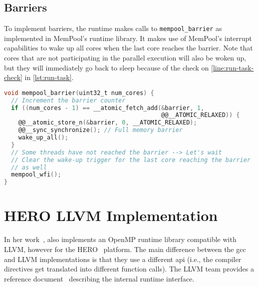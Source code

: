 \subsection{Barriers}
\label{subsec:barriers}

To implement barriers, the runtime makes calls to \texttt{mempool\_barrier} as implemented in
MemPool's runtime library. It makes use of MemPool's interrupt capabilities to wake up all cores
when the last core reaches the barrier. Note that cores that are not participating in the parallel
execution will also be woken up, but they will immediately go back to sleep because of the check on
\cref{line:run-task-check} in \cref{lst:run-task}.

\begin{lstlisting}[language=C, caption={mempool\_barrier Implementation}, label={lst:mempool-barrier},
                   escapechar=@]
void mempool_barrier(uint32_t num_cores) {
  // Increment the barrier counter
  if ((num_cores - 1) == __atomic_fetch_add(&barrier, 1,
                                            @@__ATOMIC_RELAXED)) {
    @@__atomic_store_n(&barrier, 0, __ATOMIC_RELAXED);
    @@__sync_synchronize(); // Full memory barrier
    wake_up_all();
  }
  // Some threads have not reached the barrier --> Let's wait
  // Clear the wake-up trigger for the last core reaching the barrier
  // as well
  mempool_wfi();
}
\end{lstlisting}

\section{HERO LLVM Implementation}
\label{subsec:hero_llvm_implementation}

In her work~\cite{herokmp}, \citeauthor{herokmp} also implements an OpenMP runtime library
compatible with LLVM, however for the HERO~\cite{hero} platform. The main difference between the
\gls{gcc} and LLVM implementations is that they use a different \gls{api} (i.e., the compiler
directives get translated into different function calls). The LLVM team provides a reference
document~\cite{kmpref} describing the internal runtime interface.
